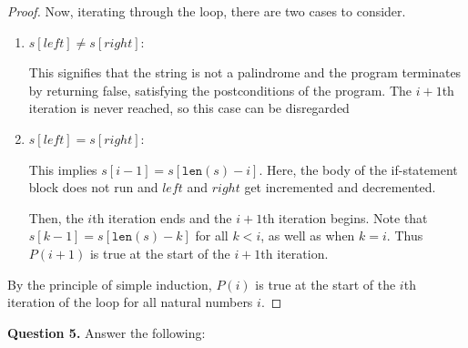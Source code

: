 \documentclass[11pt]{article}
\begin{document}
\begin{proof}
        Now, iterating through the loop, there are two cases to consider.
        \begin{enumerate}
           \item \(s[left] \neq s[right]\):
           
           This signifies that the string is not a palindrome and the program terminates by returning false, satisfying the postconditions of the program. The \(i+1\)th iteration is never reached, so this case can be disregarded

           \item \(s[left] = s[right]\):
           
           This implies \(s[i - 1] = s[\texttt{len}(s) - i]\). Here, the body of the if-statement block does not run and \(left\) and \(right\) get incremented and decremented.

           Then, the \(i\)th iteration ends and the \(i+1\)th iteration begins. Note that \(s[k-1]=s[\texttt{len}(s) - k]\) for all \(k < i\), as well as when \(k=i\). Thus \(P(i+1)\) is true at the start of the \(i+1\)th iteration.
        \end{enumerate}
        By the principle of simple induction, \(P(i)\) is true at the start of the \(i\)th iteration of the loop for all natural numbers \(i\).

    \end{proof}
    \pagebreak
    \noindent\textbf{Question 5.} Answer the following:
\end{document}
